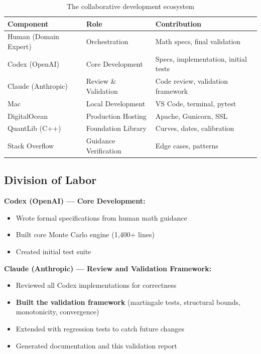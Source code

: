 \documentclass[11pt,a4paper]{article}
\begin{document}
\begin{table}[H]
\centering
\begin{tabular}{lll}
\toprule
\textbf{Component} & \textbf{Role} & \textbf{Contribution} \\
\midrule
Human (Domain Expert) & Orchestration & Math specs, final validation \\
Codex (OpenAI) & Core Development & Specs, implementation, initial tests \\
Claude (Anthropic) & Review \& Validation & Code review, validation framework \\
\midrule
Mac & Local Development & VS Code, terminal, pytest \\
DigitalOcean & Production Hosting & Apache, Gunicorn, SSL \\
QuantLib (C++) & Foundation Library & Curves, dates, calibration \\
Stack Overflow & Guidance Verification & Edge cases, patterns \\
\bottomrule
\end{tabular}
\caption{The collaborative development ecosystem}
\end{table}

\subsection{Division of Labor}

\textbf{Codex (OpenAI) --- Core Development:}
\begin{itemize}
    \item Wrote formal specifications from human math guidance
    \item Built core Monte Carlo engine (1,400+ lines)
    \item Created initial test suite
\end{itemize}

\textbf{Claude (Anthropic) --- Review and Validation Framework:}
\begin{itemize}
    \item Reviewed all Codex implementations for correctness
    \item \textbf{Built the validation framework} (martingale tests, structural bounds, monotonicity, convergence)
    \item Extended with regression tests to catch future changes
    \item Generated documentation and this validation report
\end{itemize}
\end{document}
